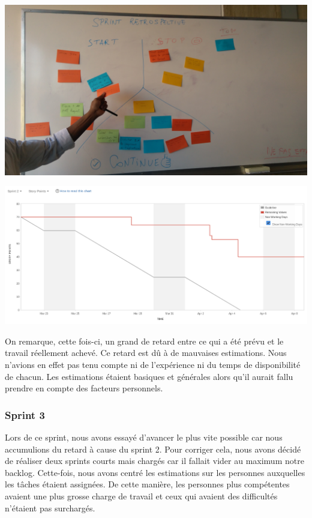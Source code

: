 \documentclass[t, 12pt, usenames,dvipsnames]{article}
\begin{document}
                \begin{center}                               
                    \includegraphics[scale=.1]{images/sprint/sprint-retro.jpg}
                    \label{fig:sprint1_retro}
                \end{center}

                \begin{center}
                    \includegraphics[scale=.25]{images/graph-new/sprint2.png}
                    \label{fig:sprint2_graph}
                \end{center}

                \noindent On remarque, cette fois-ci, un grand de retard entre ce qui a été prévu et le travail réellement achevé. Ce retard est dû à de mauvaises estimations. Nous n'avions en effet pas tenu compte ni de l'expérience ni du temps de disponibilité de chacun. Les estimations étaient basiques et générales alors qu'il aurait fallu prendre en compte des facteurs personnels.


            \subsubsection{Sprint 3}
                \noindent Lors de ce sprint, nous avons essayé d'avancer le plus vite possible car nous accumulions du retard à cause du sprint 2. Pour corriger cela, nous avons décidé de réaliser deux sprints courts mais chargés car il fallait vider au maximum notre backlog.
                Cette-fois, nous avons centré les estimations sur les personnes auxquelles les tâches étaient assignées. De cette manière, les personnes plus compétentes avaient une plus grosse charge de travail et ceux qui avaient des difficultés n'étaient pas surchargés.
                
\end{document}
